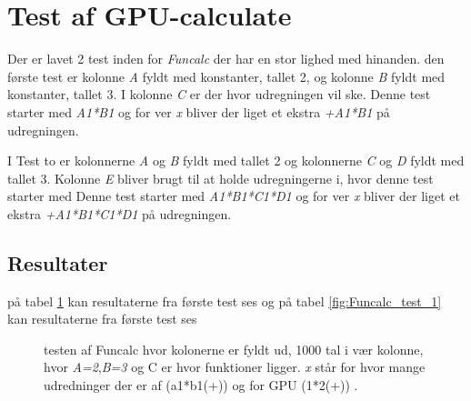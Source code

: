 \section{Test af GPU-calculate}
Der er lavet 2 test inden for \textit{Funcalc} der har en stor lighed med hinanden. den første test er kolonne \textit{A} fyldt med konstanter, tallet 2, og kolonne \textit{B} fyldt med konstanter, tallet 3. I kolonne \textit{C} er der hvor udregningen vil ske. Denne test starter med \textit{A1*B1} og for ver \textit{x} bliver der liget et ekstra \textit{+A1*B1} på udregningen.

I Test to er kolonnerne \textit{A} og \textit{B} fyldt med tallet 2 og kolonnerne \textit{C} og \textit{D} fyldt med tallet 3. Kolonne \textit{E} bliver brugt til at holde udregningerne i, hvor denne test starter med Denne test starter med \textit{A1*B1*C1*D1} og for ver \textit{x} bliver der liget et ekstra \textit{+A1*B1*C1*D1} på udregningen.

\subsection{Resultater}
på tabel \ref{fig:Funcalc_test_2} kan resultaterne fra første test ses og på tabel \ref{fig:Funcalc_test_1} kan resultaterne fra første test ses


\begin{figure}[p]
    \centering
    \caption{testen af Funcalc hvor kolonerne er fyldt ud, 1000 tal i vær kolonne, hvor \textit{A=2},\textit{B=3} og C er hvor funktioner ligger. \textit{x} står for hvor mange udredninger der er af  (a1*b1(+)) og for GPU (1*2(+)) .}
    \label{fig:Funcalc_test_2}
\end{figure}

